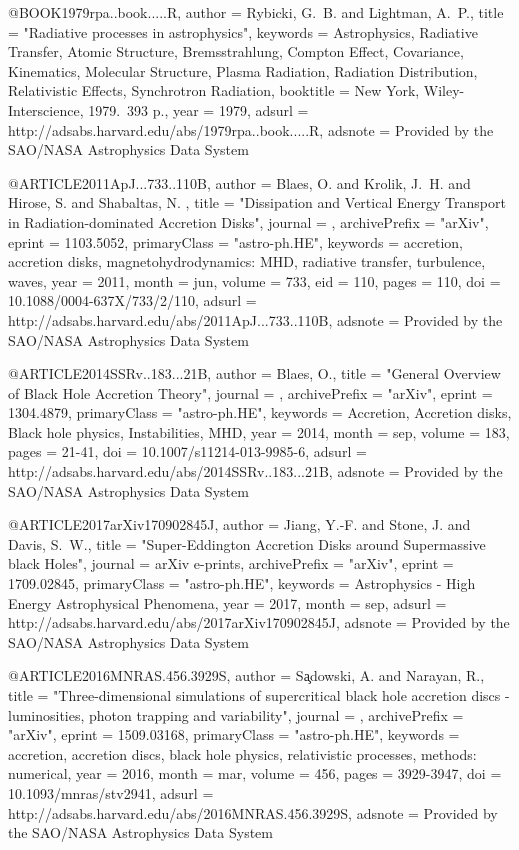 \documentclass[twocolumn,tighten]{aastex63}
\begin{document}
{{{{@BOOK{1979rpa..book.....R,
   author = {{Rybicki}, G.~B. and {Lightman}, A.~P.},
    title = "{Radiative processes in astrophysics}",
 keywords = {Astrophysics, Radiative Transfer, Atomic Structure, Bremsstrahlung, Compton Effect, Covariance, Kinematics, Molecular Structure, Plasma Radiation, Radiation Distribution, Relativistic Effects, Synchrotron Radiation},
booktitle = {New York, Wiley-Interscience, 1979.~393 p.},
     year = 1979,
   adsurl = {http://adsabs.harvard.edu/abs/1979rpa..book.....R},
  adsnote = {Provided by the SAO/NASA Astrophysics Data System}
}

@ARTICLE{2011ApJ...733..110B,
   author = {{Blaes}, O. and {Krolik}, J.~H. and {Hirose}, S. and {Shabaltas}, N.
	},
    title = "{Dissipation and Vertical Energy Transport in Radiation-dominated Accretion Disks}",
  journal = {\apj},
archivePrefix = "arXiv",
   eprint = {1103.5052},
 primaryClass = "astro-ph.HE",
 keywords = {accretion, accretion disks, magnetohydrodynamics: MHD, radiative transfer, turbulence, waves},
     year = 2011,
    month = jun,
   volume = 733,
      eid = {110},
    pages = {110},
      doi = {10.1088/0004-637X/733/2/110},
   adsurl = {http://adsabs.harvard.edu/abs/2011ApJ...733..110B},
  adsnote = {Provided by the SAO/NASA Astrophysics Data System}
}

@ARTICLE{2014SSRv..183...21B,
   author = {{Blaes}, O.},
    title = "{General Overview of Black Hole Accretion Theory}",
  journal = {\ssr},
archivePrefix = "arXiv",
   eprint = {1304.4879},
 primaryClass = "astro-ph.HE",
 keywords = {Accretion, Accretion disks, Black hole physics, Instabilities, MHD},
     year = 2014,
    month = sep,
   volume = 183,
    pages = {21-41},
      doi = {10.1007/s11214-013-9985-6},
   adsurl = {http://adsabs.harvard.edu/abs/2014SSRv..183...21B},
  adsnote = {Provided by the SAO/NASA Astrophysics Data System}
}

@ARTICLE{2017arXiv170902845J,
   author = {{Jiang}, Y.-F. and {Stone}, J. and {Davis}, S.~W.},
    title = "{Super-Eddington Accretion Disks around Supermassive black Holes}",
  journal = {arXiv e-prints},
archivePrefix = "arXiv",
   eprint = {1709.02845},
 primaryClass = "astro-ph.HE",
 keywords = {Astrophysics - High Energy Astrophysical Phenomena},
     year = 2017,
    month = sep,
   adsurl = {http://adsabs.harvard.edu/abs/2017arXiv170902845J},
  adsnote = {Provided by the SAO/NASA Astrophysics Data System}
}

@ARTICLE{2016MNRAS.456.3929S,
   author = {{S{\c a}dowski}, A. and {Narayan}, R.},
    title = "{Three-dimensional simulations of supercritical black hole accretion discs - luminosities, photon trapping and variability}",
  journal = {\mnras},
archivePrefix = "arXiv",
   eprint = {1509.03168},
 primaryClass = "astro-ph.HE",
 keywords = {accretion, accretion discs, black hole physics, relativistic processes, methods: numerical},
     year = 2016,
    month = mar,
   volume = 456,
    pages = {3929-3947},
      doi = {10.1093/mnras/stv2941},
   adsurl = {http://adsabs.harvard.edu/abs/2016MNRAS.456.3929S},
  adsnote = {Provided by the SAO/NASA Astrophysics Data System}
}

}}}}
\end{document}
